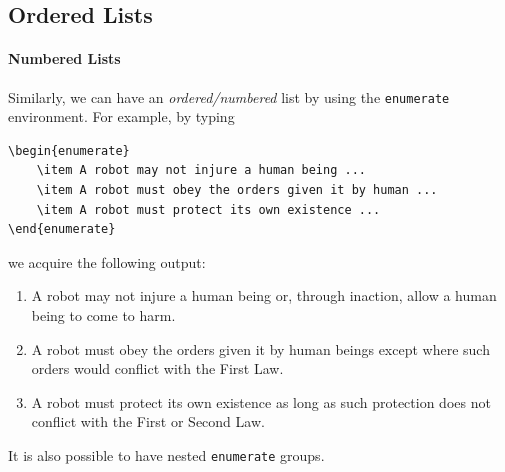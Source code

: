 \subsection{Ordered Lists}

\paragraph{Numbered Lists}
Similarly, we can have an \textit{ordered/numbered} list by using the \verb|enumerate| environment. For example, by typing
\begin{lstlisting}
\begin{enumerate}
    \item A robot may not injure a human being ...
    \item A robot must obey the orders given it by human ...
    \item A robot must protect its own existence ...
\end{enumerate}    
\end{lstlisting}
we acquire the following output:
\begin{enumerate}
    \item A robot may not injure a human being or, through inaction, allow a human being to come to harm.
    \item A robot must obey the orders given it by human beings except where such orders would conflict with the First Law.
    \item A robot must protect its own existence as long as such protection does not conflict with the First or Second Law.
\end{enumerate}
It is also possible to have nested \verb|enumerate| groups.

